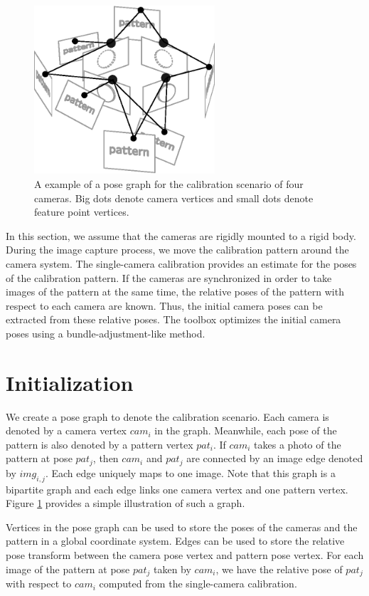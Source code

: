 \documentclass{report}
\begin{document}
\begin{figure}
\centering
\includegraphics[width=0.6\textwidth]{images/graphsample}
\caption{A example of a pose graph for the calibration scenario of four cameras. Big dots denote camera vertices and small dots denote feature point vertices.}
\label{graphSampleFig}
\end{figure}

\label{extrinsicSec}
In this section, we assume that the cameras are rigidly mounted to a rigid body. During the image capture process, we move the calibration pattern around the camera system. The single-camera calibration provides an estimate for the poses of the calibration pattern. If the cameras are synchronized in order to take images of the pattern at the same time, the relative poses of the pattern with respect to each camera are known. Thus, the initial camera poses can be extracted from these relative poses. The toolbox optimizes the initial camera poses using a bundle-adjustment-like method. 

\section{Initialization}
We create a pose graph to denote the calibration scenario. Each camera is denoted by a camera vertex $cam_i$ in the graph. Meanwhile, each pose of the pattern is also denoted by a pattern vertex $pat_i$. If $cam_i$ takes a photo of the pattern at pose $pat_j$, then $cam_i$ and $pat_j$ are connected by an image edge denoted by $img_{i, j}$. Each edge uniquely maps to one image. Note that this graph is a bipartite graph and each edge links one camera vertex and one pattern vertex. Figure \ref{graphSampleFig} provides a simple illustration of such a graph. 

Vertices in the pose graph can be used to store the poses of the cameras and the pattern in a global coordinate system. Edges can be used to store the relative pose transform between the camera pose vertex and pattern pose vertex. For each image of the pattern at pose $pat_j$ taken by $cam_i$, we have the relative pose of $pat_j$ with respect to $cam_i$ computed from the single-camera calibration.  
\end{document}
